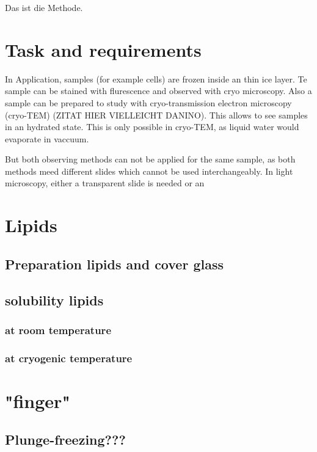 Das ist die Methode.

\section{Task and requirements}

In Application, samples (for example cells) are frozen inside an thin ice layer. Te sample can be stained with flurescence and observed with cryo microscopy. Also a sample can be prepared to study with cryo-transmission electron microscopy (cryo-TEM) (ZITAT HIER VIELLEICHT DANINO). This allows to see samples in an hydrated state. This is only possible in cryo-TEM, as liquid water would evaporate in vaccuum.

But both observing methods can not be applied for the same sample, as both methods meed different slides which cannot be used interchangeably. In light microscopy, either a transparent slide is needed or an  

\section{Lipids}

\subsection{Preparation lipids and cover glass}

\subsection{solubility lipids}

\subsubsection{at room temperature}

\subsubsection{at cryogenic temperature}

\section{"finger"}

\subsection{Plunge-freezing???}


